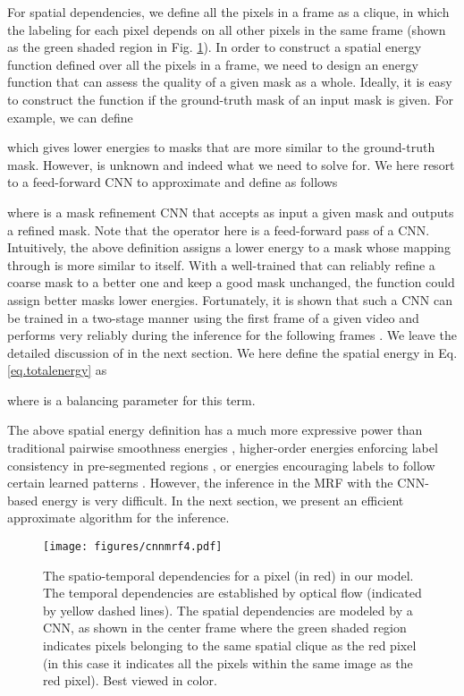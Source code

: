\documentclass[10pt,twocolumn,letterpaper]{article}
\begin{document}
For spatial dependencies, we define all the pixels in a frame as a clique,
in which the labeling for each pixel depends on all other pixels in the same frame (shown as the green shaded region in Fig. \ref{fig.cnnmrffig}).
In order to construct a spatial energy function defined over all the pixels in a frame,
we need to design an energy function  that can assess the quality of a given mask  as a whole.
Ideally, it is easy to construct the function  if the ground-truth mask  of an input mask  is given.
For example, we can define  

which gives lower energies to masks that are more similar to the ground-truth mask.
However,  is unknown and indeed what we need to solve for.
We here resort to a feed-forward CNN to approximate  and define  as follows

where  is a mask refinement CNN that accepts as input a given mask  and outputs a refined mask.
Note that the operator  here is a feed-forward pass of a CNN.
Intuitively, the above definition assigns a lower energy to a mask whose mapping through  is more similar to itself.
With a well-trained  that can reliably refine a coarse mask to a better one and keep a good mask unchanged,
the function  could assign better masks lower energies.
Fortunately, it is shown that such a CNN can be trained in a two-stage manner using the first frame of a given video
and performs very reliably during the inference for the following frames \cite{perazzi2017learning}.
We leave the detailed discussion of  in the next section.
We here define the spatial energy in Eq. \eqref{eq.totalenergy} as

where  is a balancing parameter for this term.










The above spatial energy definition has a much more expressive power than traditional pairwise smoothness energies \cite{shotton2009textonboost}, 
higher-order energies enforcing label consistency in pre-segmented regions \cite{kohli2009robust,arnab2016higher},
or energies encouraging labels to follow certain learned patterns \cite{roth2005fields}.
However, the inference in the MRF with the CNN-based energy is very difficult.
In the next section, we present an efficient approximate algorithm for the inference.


\begin{figure}[t!]
    \vspace{-1mm}
    \texttt{[image: figures/cnnmrf4.pdf]}
    \caption{The spatio-temporal dependencies for a pixel (in red) in our model.
    The temporal dependencies are established by optical flow (indicated by yellow dashed lines).
    The spatial dependencies are modeled by a CNN, as shown in the center frame where the green shaded region
    indicates pixels belonging to the same spatial clique as the red pixel (in this case it indicates all the pixels within the same image as the red pixel).
    Best viewed in color.}
    \vspace{-2mm}
    \label{fig.cnnmrffig}
\end{figure}
\end{document}
